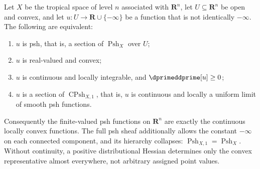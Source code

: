 \begin{theorem}
\label{thm:ch15-convexity-model}
Let $X$ be the tropical space of level $n$ associated with $\mathbf R^n$, let
$U\subseteq\mathbf R^n$ be open and convex, and let
$u:U\to\mathbf R\cup\{-\infty\}$ be a function that is not identically
$-\infty$.  The following are equivalent:
\begin{enumerate}
\item\label{itm:ch15-conv-psh} $u$ is psh, that is, a section of
  $\operatorname{Psh}_X$ over $U$;
\item\label{itm:ch15-conv-convex} $u$ is real-valued and convex;
\item\label{itm:ch15-conv-current} $u$ is continuous and locally
  integrable, and $\dprimeddprime[u]\ge0$;
\item\label{itm:ch15-conv-stage1} $u$ is a section of
  $\operatorname{CPsh}_{X,1}$, that is, $u$ is continuous and locally a
  uniform limit of smooth psh functions.
\end{enumerate}
Consequently the finite-valued psh functions on $\mathbf R^n$ are exactly
the continuous locally convex functions.  The full psh sheaf additionally
allows the constant $-\infty$ on each connected component, and its hierarchy
collapses: $\operatorname{Psh}_{X,1}=\operatorname{Psh}_X$.  Without
continuity, a positive distributional Hessian determines only the convex
representative almost everywhere, not arbitrary assigned point values.
\end{theorem}

